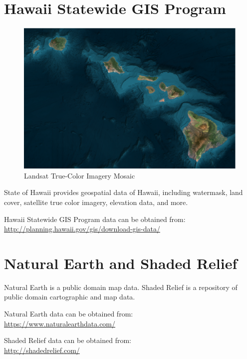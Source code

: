 \section{Hawaii Statewide GIS Program}

\begin{figure}[h!]
  \centering
  \includegraphics[width=120mm]{eps/hawaii_gis_landsat_7.eps}
  \caption{Landsat True-Color Imagery Mosaic}
\end{figure}

State of Hawaii provides geospatial data of Hawaii, including watermask, land cover, satellite true color imagery, elevation data, and more.

Hawaii Statewide GIS Program data can be obtained from: \cite{Terrain-StateOfHawaiiGIS} \\
\url{http://planning.hawaii.gov/gis/download-gis-data/}

\section{Natural Earth and Shaded Relief}

Natural Earth is a public domain map data. Shaded Relief is a repository of public domain cartographic and map data.

Natural Earth data can be obtained from: \cite{Terrain-NaturalEarth}  \\
\url{https://www.naturalearthdata.com/}

Shaded Relief data can be obtained from: \cite{Terrain-ShadedRelief} \\
\url{http://shadedrelief.com/}
